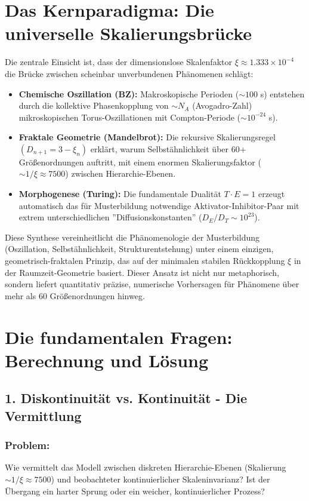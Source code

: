 \section*{Das Kernparadigma: Die universelle Skalierungsbrücke}
	
	Die zentrale Einsicht ist, dass der dimensionslose Skalenfaktor $\xi \approx 1.333 \times 10^{-4}$ die Brücke zwischen scheinbar unverbundenen Phänomenen schlägt:
	
	\begin{itemize}[label=$\bullet$]
		\item \textbf{Chemische Oszillation (BZ):} Makroskopische Perioden ($\sim 100$ s) entstehen durch die kollektive Phasenkopplung von $\sim N_A$ (Avogadro-Zahl) mikroskopischen Torus-Oszillationen mit Compton-Periode ($\sim 10^{-24}$ s).
		
		\item \textbf{Fraktale Geometrie (Mandelbrot):} Die rekursive Skalierungsregel $(D_{n+1} = 3 - \xi_n)$ erklärt, warum Selbstähnlichkeit über 60+ Größenordnungen auftritt, mit einem enormen Skalierungsfaktor ($\sim 1/\xi \approx 7500$) zwischen Hierarchie-Ebenen.
		
		\item \textbf{Morphogenese (Turing):} Die fundamentale Dualität $T \cdot E = 1$ erzeugt automatisch das für Musterbildung notwendige Aktivator-Inhibitor-Paar mit extrem unterschiedlichen ''Diffusionskonstanten'' ($D_E/D_T \sim 10^{23}$).
	\end{itemize}
	
	Diese Synthese vereinheitlicht die Phänomenologie der Musterbildung (Oszillation, Selbstähnlichkeit, Strukturentstehung) unter einem einzigen, geometrisch-fraktalen Prinzip, das auf der minimalen stabilen Rückkopplung $\xi$ in der Raumzeit-Geometrie basiert. Dieser Ansatz ist nicht nur metaphorisch, sondern liefert quantitativ präzise, numerische Vorhersagen für Phänomene über mehr als 60 Größenordnungen hinweg.
	
	\section*{Die fundamentalen Fragen: Berechnung und Lösung}
	
	\subsection*{1. Diskontinuität vs. Kontinuität - Die Vermittlung}
	
	\subsubsection*{Problem:}
	Wie vermittelt das Modell zwischen diskreten Hierarchie-Ebenen (Skalierung $\sim 1/\xi \approx 7500$) und beobachteter kontinuierlicher Skaleninvarianz? Ist der Übergang ein harter Sprung oder ein weicher, kontinuierlicher Prozess?
	
